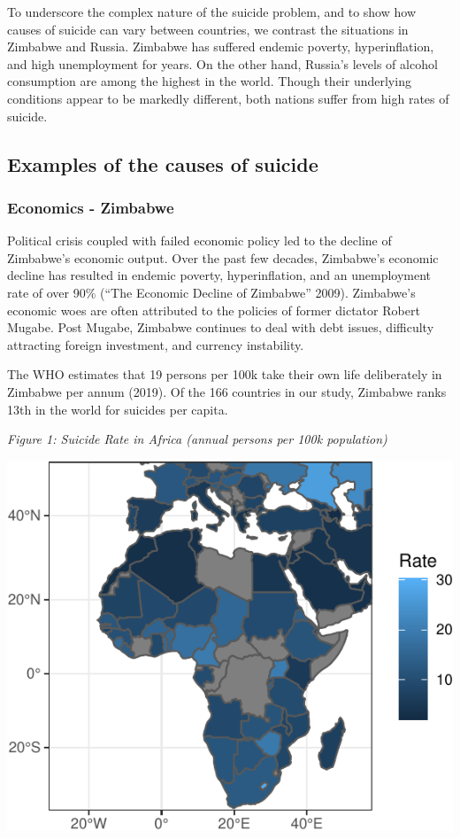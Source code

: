 \documentclass[]{article}
\begin{document}
To underscore the complex nature of the suicide problem, and to show how
causes of suicide can vary between countries, we contrast the situations
in Zimbabwe and Russia. Zimbabwe has suffered endemic poverty,
hyperinflation, and high unemployment for years. On the other hand,
Russia's levels of alcohol consumption are among the highest in the
world. Though their underlying conditions appear to be markedly
different, both nations suffer from high rates of suicide.

\subsection{Examples of the causes of
suicide}\label{examples-of-the-causes-of-suicide}

\subsubsection{Economics - Zimbabwe}\label{economics---zimbabwe}

Political crisis coupled with failed economic policy led to the decline
of Zimbabwe's economic output. Over the past few decades, Zimbabwe's
economic decline has resulted in endemic poverty, hyperinflation, and an
unemployment rate of over 90\% (``The Economic Decline of Zimbabwe''
2009). Zimbabwe's economic woes are often attributed to the policies of
former dictator Robert Mugabe. Post Mugabe, Zimbabwe continues to deal
with debt issues, difficulty attracting foreign investment, and currency
instability.

The WHO estimates that 19 persons per 100k take their own life
deliberately in Zimbabwe per annum (2019). Of the 166 countries in our
study, Zimbabwe ranks 13th in the world for suicides per capita.

\emph{Figure 1: Suicide Rate in Africa (annual persons per 100k
population)}

\begin{center}\includegraphics{Project_Report_files/figure-latex/africa_map_plot-1} \end{center}
\end{document}

